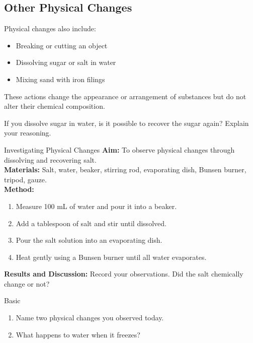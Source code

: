 \subsection{Other Physical Changes}

Physical changes also include:

\begin{itemize}
\item Breaking or cutting an object
\item Dissolving sugar or salt in water
\item Mixing sand with iron filings
\end{itemize}

These actions change the appearance or arrangement of substances but do not alter their chemical composition.

\begin{stopandthink}
If you dissolve sugar in water, is it possible to recover the sugar again? Explain your reasoning.
\end{stopandthink}

\begin{investigation}{Investigating Physical Changes}
\textbf{Aim:} To observe physical changes through dissolving and recovering salt.\\[5pt]
\textbf{Materials:} Salt, water, beaker, stirring rod, evaporating dish, Bunsen burner, tripod, gauze.\\[5pt]
\textbf{Method:}
\begin{enumerate}
\item Measure 100 mL of water and pour it into a beaker.
\item Add a tablespoon of salt and stir until dissolved.
\item Pour the salt solution into an evaporating dish.
\item Heat gently using a Bunsen burner until all water evaporates.
\end{enumerate}
\textbf{Results and Discussion:} Record your observations. Did the salt chemically change or not?
\end{investigation}

\begin{tieredquestions}{Basic}
\begin{enumerate}
\item Name two physical changes you observed today.
\item What happens to water when it freezes?
\end{enumerate}
\end{tieredquestions}

